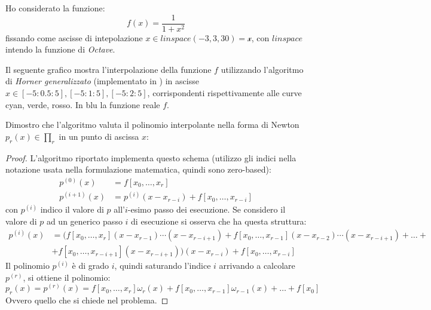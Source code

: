 Ho considerato la funzione:
\begin{displaymath}
 f(x) = \frac{1}{1 + x^{2}}
\end{displaymath}
fissando come ascisse di intepolazione $x \in linspace(-3, 3,30) = \mathcal{x}$,
con $linspace$ intendo la funzione di \emph{Octave}.

Il seguente grafico mostra l'interpolazione della funzione $f$ utilizzando
l'algoritmo di \emph{Horner generalizzato} (implementato in
) in ascisse $\hat{x} \in [-5:0.5:5],
[-5:1:5], [-5:2:5]$, corrispondenti rispettivamente alle curve cyan, verde,
rosso. In blu la funzione reale $f$.
\begin{center} 

\end{center}

Dimostro che l'algoritmo   valuta il
polinomio interpolante nella forma di Newton $p_{r}(x) \in \prod_{r}$ in un
punto di ascissa $x$:
\begin{proof}
L'algoritmo riportato implementa questo schema (utilizzo gli indici nella
notazione usata nella formulazione matematica, quindi sono zero-based):
\begin{displaymath}
\begin{split}
	p^{(0)}(x) &= f[x_{0},\ldots, x_{r}] \\
	p^{(i+1)}(x) &= p^{(i)}(x - x_{r-i})  + f[x_{0}, \ldots, x_{r-i}]  
\end{split}
\end{displaymath}
con $p^{(i)}$ indico il valore di $p$ all'$i$-esimo passo dei esecuzione. 
Se considero il valore di $p$ ad un generico passo $i$ di esecuzione si
osserva che ha questa struttura:
\begin{displaymath}
\begin{split}
	p^{(i)}(x) &= \big(f[x_{0},\ldots, x_{r}](x - x_{r-1})\cdots(x - x_{r-i+1}) +
	f[x_{0},\ldots, x_{r-1}](x - x_{r-2})\cdots(x - x_{r-i+1}) + \ldots +\\
	&+ f[x_{0},\ldots, x_{r-i+1}](x - x_{r-i+1})\big)(x-x_{r-i}) + f[x_{0},\ldots,
	x_{r-i}]
\end{split}
\end{displaymath}
Il polinomio $p^{(i)}$ \`e di grado $i$, quindi saturando l'indice $i$ arrivando
a calcolare $p^{(r)}$, si ottiene il polinomio:
\begin{displaymath}
	p_{r}(x) = p^{(r)}(x) = f[x_{0},\ldots,	x_{r}]\omega_{r}(x) + 
		f[x_{0},\ldots,	x_{r-1}]\omega_{r-1}(x) + \ldots + f[x_{0}] 
\end{displaymath}
Ovvero quello che si chiede nel problema.
\end{proof}

